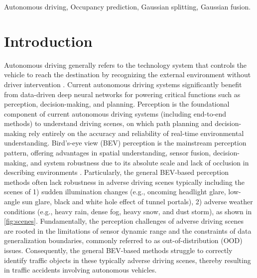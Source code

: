 \documentclass[journal]{IEEEtran}
\begin{document}
\begin{IEEEkeywords}
Autonomous driving, Occupancy prediction, Gaussian splitting, Gaussian fusion.
\end{IEEEkeywords}

%

\section{Introduction}
\label{sec:intro}

Autonomous driving generally refers to the technology system that controls the vehicle to reach the destination by recognizing the external environment without driver intervention \cite{lan2024sustechgan}.
Current autonomous driving systems significantly benefit from data-driven deep neural networks for powering critical functions such as perception, decision-making, and planning.
Perception is the foundational component of current autonomous driving systems (including end-to-end methods) to understand driving scenes, on which path planning and decision-making rely entirely on the accuracy and reliability of real-time environmental understanding.
Bird’s-eye view (BEV) perception is the mainstream perception pattern, offering advantages in spatial understanding, sensor fusion, decision-making, and system robustness due to its absolute scale and lack of occlusion in describing environments \cite{li2023delving}.
Particularly, the general BEV-based perception methods often lack robustness in adverse driving scenes typically including the scenes of 1) sudden illumination changes (e.g., oncoming headlight glare, low-angle sun glare, black and white hole effect of tunnel portals), 2) adverse weather conditions (e.g., heavy rain, dense fog, heavy snow, and
dust storm), as shown in \autoref{fig:scenes}.
Fundamentally, the perception challenges of adverse driving scenes are rooted in the limitations of sensor dynamic range and the constraints of data generalization boundaries, commonly referred to as out-of-distribution (OOD) issues. 
Consequently, the general BEV-based methods struggle to correctly identify traffic objects in these typically adverse driving scenes, thereby resulting in traffic accidents involving autonomous vehicles.
\end{document}
